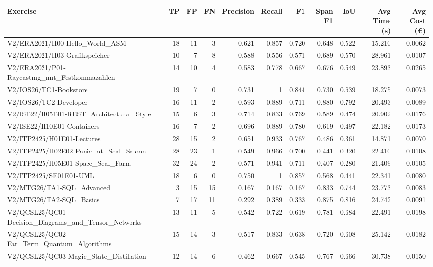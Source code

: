 \begin{tabular}{lrrrrrrrrrr}
Exercise & TP & FP & FN & Precision & Recall & F1 & Span F1 & IoU & Avg Time (s) & Avg Cost (€) \\
\hline
V2/ERA2021/H00-Hello\_World\_ASM & 18 & 11 & 3 & 0.621 & 0.857 & 0.720 & 0.648 & 0.522 & 15.210 & 0.0062 \\
V2/ERA2021/H03-Grafikspeicher & 10 & 7 & 8 & 0.588 & 0.556 & 0.571 & 0.689 & 0.570 & 28.961 & 0.0107 \\
V2/ERA2021/P01-Raycasting\_mit\_Festkommazahlen & 14 & 10 & 4 & 0.583 & 0.778 & 0.667 & 0.676 & 0.549 & 23.893 & 0.0265 \\
V2/IOS26/TC1-Bookstore & 19 & 7 & 0 & 0.731 & 1 & 0.844 & 0.730 & 0.639 & 18.275 & 0.0073 \\
V2/IOS26/TC2-Developer & 16 & 11 & 2 & 0.593 & 0.889 & 0.711 & 0.880 & 0.792 & 20.493 & 0.0089 \\
V2/ISE22/H05E01-REST\_Architectural\_Style & 15 & 6 & 3 & 0.714 & 0.833 & 0.769 & 0.589 & 0.474 & 20.902 & 0.0176 \\
V2/ISE22/H10E01-Containers & 16 & 7 & 2 & 0.696 & 0.889 & 0.780 & 0.619 & 0.497 & 22.182 & 0.0173 \\
V2/ITP2425/H01E01-Lectures & 28 & 15 & 2 & 0.651 & 0.933 & 0.767 & 0.486 & 0.361 & 14.871 & 0.0070 \\
V2/ITP2425/H02E02-Panic\_at\_Seal\_Saloon & 28 & 23 & 1 & 0.549 & 0.966 & 0.700 & 0.441 & 0.320 & 22.410 & 0.0108 \\
V2/ITP2425/H05E01-Space\_Seal\_Farm & 32 & 24 & 2 & 0.571 & 0.941 & 0.711 & 0.407 & 0.280 & 21.409 & 0.0105 \\
V2/ITP2425/SE01E01-UML & 18 & 6 & 0 & 0.750 & 1 & 0.857 & 0.568 & 0.441 & 22.341 & 0.0080 \\
V2/MTG26/TA1-SQL\_Advanced & 3 & 15 & 15 & 0.167 & 0.167 & 0.167 & 0.833 & 0.744 & 23.773 & 0.0083 \\
V2/MTG26/TA2-SQL\_Basics & 7 & 17 & 11 & 0.292 & 0.389 & 0.333 & 0.875 & 0.816 & 24.742 & 0.0091 \\
V2/QCSL25/QC01-Decision\_Diagrams\_and\_Tensor\_Networks & 13 & 11 & 5 & 0.542 & 0.722 & 0.619 & 0.781 & 0.684 & 22.491 & 0.0198 \\
V2/QCSL25/QC02-Far\_Term\_Quantum\_Algorithms & 15 & 14 & 3 & 0.517 & 0.833 & 0.638 & 0.720 & 0.608 & 25.142 & 0.0182 \\
V2/QCSL25/QC03-Magic\_State\_Distillation & 12 & 14 & 6 & 0.462 & 0.667 & 0.545 & 0.767 & 0.666 & 30.738 & 0.0150 \\
\end{tabular}

